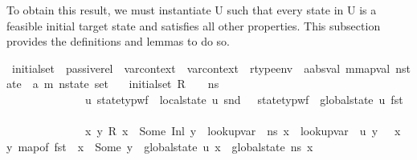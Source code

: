 \begin{isabellebody}
\begin{isamarkuptext}
To obtain this result, we must instantiate U such that every state in U is a feasible initial
target state and satisfies all other properties. This subsection provides the definitions and lemmas
to do so.%
\end{isamarkuptext}\isamarkuptrue%
\isamarkupfalse%
\ initial{\isacharunderscore}{\kern0pt}set\ {\isacharcolon}{\kern0pt}{\isacharcolon}{\kern0pt}\ {\isachardoublequoteopen}passive{\isacharunderscore}{\kern0pt}rel\ {\isasymRightarrow}\ var{\isacharunderscore}{\kern0pt}context\ {\isasymRightarrow}\ var{\isacharunderscore}{\kern0pt}context\ {\isasymRightarrow}\ rtype{\isacharunderscore}{\kern0pt}env\ {\isasymRightarrow}\ {\isacharparenleft}{\kern0pt}{\isacharprime}{\kern0pt}a{\isacharcolon}{\kern0pt}{\isacharcolon}{\kern0pt}absval{\isacharcomma}{\kern0pt}\ {\isacharprime}{\kern0pt}m{\isacharcolon}{\kern0pt}{\isacharcolon}{\kern0pt}mapval{\isacharparenright}{\kern0pt}\ nstate\ {\isasymRightarrow}\ {\isacharparenleft}{\kern0pt}{\isacharparenleft}{\kern0pt}{\isacharprime}{\kern0pt}a{\isacharcomma}{\kern0pt}\ {\isacharprime}{\kern0pt}m{\isacharparenright}{\kern0pt}\ nstate{\isacharparenright}{\kern0pt}\ set{\isachardoublequoteclose}\isanewline
\ \ \ {\isachardoublequoteopen}initial{\isacharunderscore}{\kern0pt}set\ R\ {\isasymLambda}\ {\isasymLambda}{\isacharprime}{\kern0pt}\ {\isasymOmega}\ ns\ {\isacharequal}{\kern0pt}\ \isanewline
\ \ \ \ \ \ \ \ \ \ \ \ \ \ {\isacharbraceleft}{\kern0pt}u{\isachardot}{\kern0pt}\ state{\isacharunderscore}{\kern0pt}typ{\isacharunderscore}{\kern0pt}wf\ {\isasymOmega}\ {\isacharparenleft}{\kern0pt}local{\isacharunderscore}{\kern0pt}state\ u{\isacharparenright}{\kern0pt}\ {\isacharparenleft}{\kern0pt}snd\ {\isasymLambda}{\isacharprime}{\kern0pt}{\isacharparenright}{\kern0pt}\ {\isasymand}\ state{\isacharunderscore}{\kern0pt}typ{\isacharunderscore}{\kern0pt}wf\ {\isasymOmega}\ {\isacharparenleft}{\kern0pt}global{\isacharunderscore}{\kern0pt}state\ u{\isacharparenright}{\kern0pt}\ {\isacharparenleft}{\kern0pt}fst\ {\isasymLambda}{\isacharprime}{\kern0pt}{\isacharparenright}{\kern0pt}\ {\isasymand}\isanewline
\ \ \ \ \ \ \ \ \ \ \ \ \ \ {\isacharparenleft}{\kern0pt}{\isasymforall}x\ y{\isachardot}{\kern0pt}\ R\ x\ {\isacharequal}{\kern0pt}\ Some\ {\isacharparenleft}{\kern0pt}Inl\ y{\isacharparenright}{\kern0pt}\ {\isasymlongrightarrow}\ lookup{\isacharunderscore}{\kern0pt}var\ {\isasymLambda}\ ns\ x\ {\isacharequal}{\kern0pt}\ lookup{\isacharunderscore}{\kern0pt}var\ {\isasymLambda}{\isacharprime}{\kern0pt}\ u\ y{\isacharparenright}{\kern0pt}\ {\isasymand}\ {\isacharparenleft}{\kern0pt}{\isasymforall}\ x\ y{\isachardot}{\kern0pt}\ map{\isacharunderscore}{\kern0pt}of\ {\isacharparenleft}{\kern0pt}fst\ {\isasymLambda}{\isacharparenright}{\kern0pt}\ x\ {\isacharequal}{\kern0pt}\ Some\ y\ {\isasymlongrightarrow}\ {\isacharparenleft}{\kern0pt}global{\isacharunderscore}{\kern0pt}state\ u{\isacharparenright}{\kern0pt}\ x\ {\isacharequal}{\kern0pt}\ {\isacharparenleft}{\kern0pt}global{\isacharunderscore}{\kern0pt}state\ ns{\isacharparenright}{\kern0pt}\ x{\isacharparenright}{\kern0pt}\ {\isasymand}\isanewline

\end{isabellebody}
